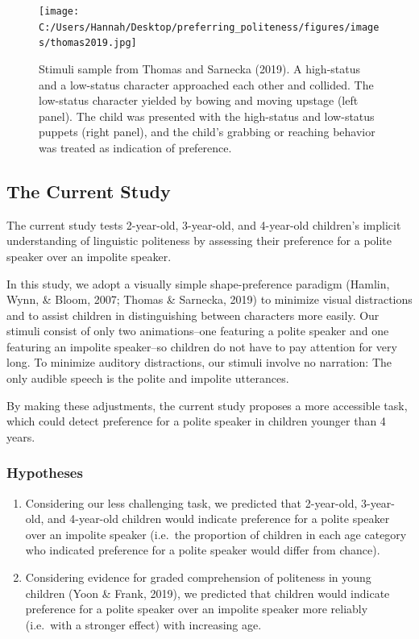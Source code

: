 \documentclass[
  english,
  man,floatsintext]{apa6}
\begin{document}
\newpage

\begin{figure}
\centering
\texttt{[image: C:/Users/Hannah/Desktop/preferring\_politeness/figures/images/thomas2019.jpg]}
\caption{Stimuli sample from Thomas and Sarnecka (2019). A high-status and a low-status character approached each other and collided. The low-status character yielded by bowing and moving upstage (left panel). The child was presented with the high-status and low-status puppets (right panel), and the child's grabbing or reaching behavior was treated as indication of preference.}
\end{figure}

\newpage

\hypertarget{the-current-study}{%
\subsection{The Current Study}\label{the-current-study}}

The current study tests 2-year-old, 3-year-old, and 4-year-old children's implicit understanding of linguistic politeness by assessing their preference for a polite speaker over an impolite speaker.

In this study, we adopt a visually simple shape-preference paradigm (Hamlin, Wynn, \& Bloom, 2007; Thomas \& Sarnecka, 2019) to minimize visual distractions and to assist children in distinguishing between characters more easily. Our stimuli consist of only two animations--one featuring a polite speaker and one featuring an impolite speaker--so children do not have to pay attention for very long. To minimize auditory distractions, our stimuli involve no narration: The only audible speech is the polite and impolite utterances.

By making these adjustments, the current study proposes a more accessible task, which could detect preference for a polite speaker in children younger than 4 years.

\hypertarget{hypotheses}{%
\subsubsection{Hypotheses}\label{hypotheses}}

\begin{enumerate}
\def\labelenumi{\arabic{enumi}.}
\item
  Considering our less challenging task, we predicted that 2-year-old, 3-year-old, and 4-year-old children would indicate preference for a polite speaker over an impolite speaker (i.e.~the proportion of children in each age category who indicated preference for a polite speaker would differ from chance).
\item
  Considering evidence for graded comprehension of politeness in young children (Yoon \& Frank, 2019), we predicted that children would indicate preference for a polite speaker over an impolite speaker more reliably (i.e.~with a stronger effect) with increasing age.
\end{enumerate}
\end{document}
